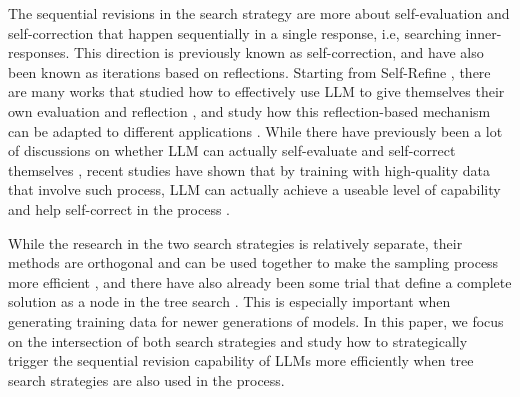 The sequential revisions in the search strategy are more about self-evaluation and self-correction that happen sequentially in a single response, i.e, searching inner-responses. This direction is previously known as self-correction, and have also been known as iterations based on reflections. Starting from Self-Refine \cite{madaan2024self}, there are many works that studied how to effectively use LLM to give themselves their own evaluation and reflection \cite{yao2022react, shinn2023reflexion}, and study how this reflection-based mechanism can be adapted to different applications \cite{chen2023teaching, gou2023critic, chen2024reprompt}. While there have previously been a lot of discussions on whether LLM can actually self-evaluate and self-correct themselves \cite{huang2023large, chen2024tree, verma2024brittle}, recent studies have shown that by training with high-quality data that involve such process, LLM can actually achieve a useable level of capability and help self-correct in the process \cite{huang2024o1, zeng2024scaling, deepseekai2025deepseekr1incentivizingreasoningcapability}. 

While the research in the two search strategies is relatively separate, their methods are orthogonal and can be used together to make the sampling process more efficient \cite{snell2024scaling}, and there have also already been some trial that define a complete solution as a node in the tree search \cite{zhang2024accessing, zhang2024llama}. This is especially important when generating training data for newer generations of models. 
In this paper, we focus on the intersection of both search strategies and study how to strategically trigger the sequential revision capability of LLMs more efficiently when tree search strategies are also used in the process.